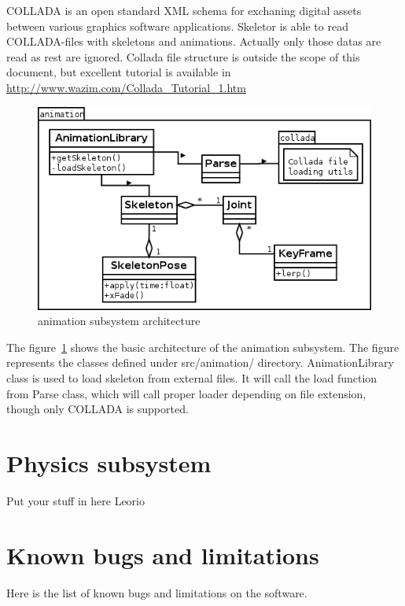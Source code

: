 \documentclass[11pt,twoside,a4paper]{article}
\begin{document}
COLLADA is an open standard XML schema for exchaning digital assets between various graphics software applications. Skeletor is able to read COLLADA-files with skeletons and animations. Actually only those datas are read as rest are ignored. Collada file structure is outside the scope of this document, but excellent tutorial is available in \url{http://www.wazim.com/Collada_Tutorial_1.htm}

\begin{figure}
  \centering
    \includegraphics[scale=0.7]{animation_subsystem.png}
  \caption{animation subsystem architecture}
  \label{animsubsys}
\end{figure}

The figure~\ref{animsubsys} shows the basic architecture of the animation subsystem. The figure represents the classes defined under src/animation/ directory. AnimationLibrary class is used to load skeleton from external files. It will call the load function from Parse class, which will call proper loader depending on file extension, though only COLLADA is supported.

\section{Physics subsystem}

Put your stuff in here Leorio~


\section{Known bugs and limitations}

Here is the list of known bugs and limitations on the software.
\end{document}
